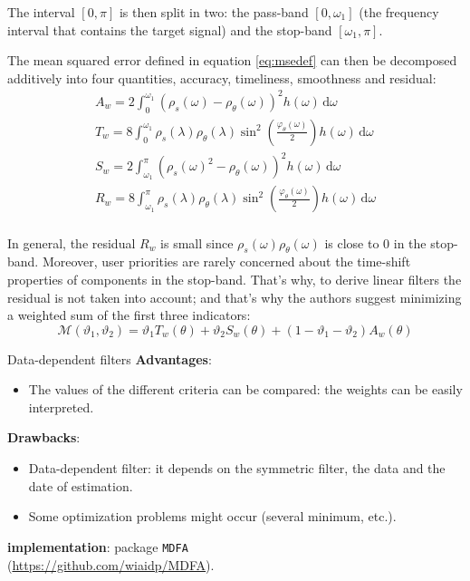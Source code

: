\documentclass[fleqn,10pt]{latex/stylish_article} %
\providecommand{\tightlist}{%
  \setlength{\itemsep}{0pt}\setlength{\parskip}{0pt}}
\newcommand\1{\mathds{1}}
\newcommand\ud{\,\mathrm{d}}
\begin{document}
The interval \([0,\pi]\) is then split in two: the pass-band \([0,\omega_1]\) (the frequency interval that contains the target signal) and the stop-band \([\omega_1,\pi]\).

The mean squared error defined in equation \eqref{eq:msedef} can then be decomposed additively into four quantities, accuracy, timeliness, smoothness and residual:
\begin{gather*}
A_w= 2\int_0^{\omega_1}\left(\rho_s(\omega)-\rho_\theta(\omega)\right)^{2}h(\omega)\ud\omega\\
T_w= 8\int_0^{\omega_1}\rho_s(\lambda)\rho_\theta(\lambda)\sin^{2}\left(\frac{\varphi_\theta(\omega)}{2}\right)h(\omega)\ud\omega\\
S_w= 2\int_{\omega_1}^\pi\left(\rho_s(\omega)^{2}-\rho_\theta(\omega)\right)^{2}h(\omega)\ud\omega\\
R_w= 8\int_{\omega_1}^\pi\rho_s(\lambda)\rho_\theta(\lambda)\sin^{2}\left(\frac{\varphi_\theta(\omega)}{2}\right)h(\omega)\ud\omega\\
\end{gather*}

In general, the residual \(R_w\) is small since \(\rho_s(\omega)\rho_\theta(\omega)\) is close to 0 in the stop-band.
Moreover, user priorities are rarely concerned about the time-shift properties of components in the stop-band.
That's why, to derive linear filters the residual is not taken into account; and that's why the authors suggest minimizing a weighted sum of the first three indicators:
\[
\mathcal{M}(\vartheta_{1},\vartheta_{2})=\vartheta_{1}T_w(\theta)+\vartheta_{2}S_w(\theta)+(1-\vartheta_{1}-\vartheta_{2})A_w(\theta)
\]

\begin{summary}{Data-dependent filters}
\textbf{Advantages}:

\begin{itemize}
\tightlist
\item
  The values of the different criteria can be compared: the weights can be easily interpreted.
\end{itemize}

\textbf{Drawbacks}:

\begin{itemize}
\item
  Data-dependent filter: it depends on the symmetric filter, the data and the date of estimation.
\item
  Some optimization problems might occur (several minimum, etc.).
\end{itemize}

\textbf{\faRProject{} implementation}: package \texttt{MDFA}\\
(\url{https://github.com/wiaidp/MDFA}).

\end{summary}
\end{document}

